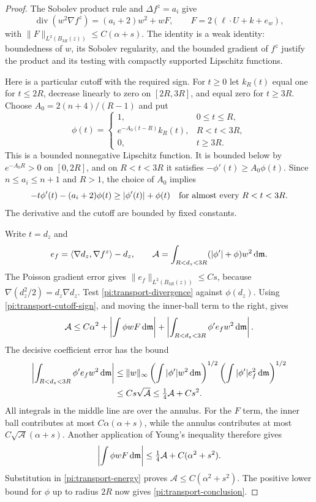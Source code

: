 \begin{proof}
The Sobolev product rule and $\Delta f^z=a_i$ give
\begin{equation}
 \operatorname{div}(w^2\nabla f^z)
 =(a_i+2)w^2+wF,\qquad
 F=2(\ell\cdot U+k+e_w),
 \label{pi:transport-divergence}
\end{equation}
with $\|F\|_{L^2(B_{3R}(z))}\le C(\alpha+s)$.
The identity is a weak identity: boundedness of $w$, its Sobolev
regularity, and the bounded gradient of $f^z$ justify the product
and its testing with compactly supported Lipschitz functions.

Here is a particular cutoff with the required sign.  For $t\ge0$
let $k_R(t)$ equal one for $t\le2R$, decrease linearly to zero
on $[2R,3R]$, and equal zero for $t\ge3R$.  Choose
$A_0=2(n+4)/(R-1)$ and put
\[
 \phi(t)=
 \begin{cases}
 1,&0\le t\le R,\\
 e^{-A_0(t-R)}k_R(t),&R<t<3R,\\
 0,&t\ge3R.
 \end{cases}
\]
This is a bounded nonnegative Lipschitz function.  It is bounded
below by $e^{-A_0R}>0$ on $[0,2R]$, and on $R<t<3R$ it
satisfies $-\phi'(t)\ge A_0\phi(t)$.  Since
$n\le a_i\le n+1$ and $R>1$, the choice of $A_0$ implies
\begin{equation}
 -t\phi'(t)-(a_i+2)\phi(t)
 \ge |\phi'(t)|+\phi(t)
 \quad\hbox{for almost every }R<t<3R.
 \label{pi:transport-cutoff-sign}
\end{equation}
The derivative and the cutoff are bounded by fixed constants.

Write $t=d_z$ and
\[
 e_f=\langle\nabla d_z,\nabla f^z\rangle-d_z,
 \qquad
 \mathcal A=\int_{R<d_z<3R}(|\phi'|+\phi)w^2\,\mathrm d\mathfrak m.
\]
The Poisson gradient error gives
$\|e_f\|_{L^2(B_{3R}(z))}\le Cs$, because
$\nabla(d_z^2/2)=d_z\nabla d_z$.  Test
\eqref{pi:transport-divergence} against $\phi(d_z)$.
Using \eqref{pi:transport-cutoff-sign}, and moving the inner-ball
term to the right, gives
\begin{equation}
 \mathcal A\le C\alpha^2
   +\left|\int\phi wF\,\mathrm d\mathfrak m\right|
   +\left|\int_{R<d_z<3R}\phi'e_f w^2\,\mathrm d\mathfrak m\right|.
 \label{pi:transport-energy}
\end{equation}
The decisive coefficient error has the bound
\begin{align}
 \left|\int_{R<d_z<3R}\phi'e_f w^2\,\mathrm d\mathfrak m\right|
 &\le\|w\|_\infty
       \left(\int|\phi'|w^2\,\mathrm d\mathfrak m\right)^{1/2}
       \left(\int|\phi'|e_f^2\,\mathrm d\mathfrak m\right)^{1/2}\notag\\
 &\le Cs\sqrt{\mathcal A}
 \le\tfrac14\mathcal A+Cs^2.
 \label{pi:transport-square-error}
\end{align}
All integrals in the middle line are over the annulus.
For the $F$ term, the inner ball contributes at most
$C\alpha(\alpha+s)$, while the annulus contributes at most
$C\sqrt{\mathcal A}(\alpha+s)$.  Another application of
Young's inequality therefore gives
\[
 \left|\int\phi wF\,\mathrm d\mathfrak m\right|
 \le\tfrac14\mathcal A+C(\alpha^2+s^2).
\]
Substitution in \eqref{pi:transport-energy} proves
$\mathcal A\le C(\alpha^2+s^2)$.  The positive lower bound for
$\phi$ up to radius $2R$ now gives
\eqref{pi:transport-conclusion}.


\end{proof}

